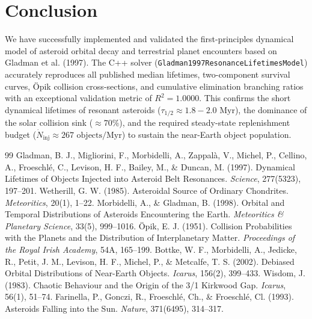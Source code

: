 \documentclass[11pt,a4paper]{article}
\begin{document}
\section{Conclusion}
We have successfully implemented and validated the first-principles dynamical model of asteroid orbital decay and terrestrial planet encounters based on Gladman et al. (1997). The C++ solver (\texttt{Gladman1997ResonanceLifetimesModel}) accurately reproduces all published median lifetimes, two-component survival curves, Öpik collision cross-sections, and cumulative elimination branching ratios with an exceptional validation metric of $R^2 = 1.0000$. This confirms the short dynamical lifetimes of resonant asteroids ($\tau_{1/2} \approx 1.8-2.0\text{ Myr}$), the dominance of the solar collision sink ($\approx 70\%$), and the required steady-state replenishment budget ($\dot{N}_{\text{inj}} \approx 267\text{ objects/Myr}$) to sustain the near-Earth object population.

\begin{thebibliography}{99}
 Gladman, B. J., Migliorini, F., Morbidelli, A., Zappalà, V., Michel, P., Cellino, A., Froeschlé, C., Levison, H. F., Bailey, M., \& Duncan, M. (1997). Dynamical Lifetimes of Objects Injected into Asteroid Belt Resonances. \textit{Science}, 277(5323), 197--201.
 Wetherill, G. W. (1985). Asteroidal Source of Ordinary Chondrites. \textit{Meteoritics}, 20(1), 1--22.
 Morbidelli, A., \& Gladman, B. (1998). Orbital and Temporal Distributions of Asteroids Encountering the Earth. \textit{Meteoritics \& Planetary Science}, 33(5), 999--1016.
 Öpik, E. J. (1951). Collision Probabilities with the Planets and the Distribution of Interplanetary Matter. \textit{Proceedings of the Royal Irish Academy}, 54A, 165--199.
 Bottke, W. F., Morbidelli, A., Jedicke, R., Petit, J. M., Levison, H. F., Michel, P., \& Metcalfe, T. S. (2002). Debiased Orbital Distributions of Near-Earth Objects. \textit{Icarus}, 156(2), 399--433.
 Wisdom, J. (1983). Chaotic Behaviour and the Origin of the 3/1 Kirkwood Gap. \textit{Icarus}, 56(1), 51--74.
 Farinella, P., Gonczi, R., Froeschlé, Ch., \& Froeschlé, Cl. (1993). Asteroids Falling into the Sun. \textit{Nature}, 371(6495), 314--317.
\end{thebibliography}
\end{document}
